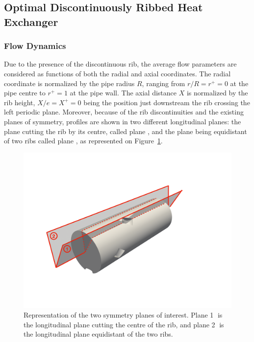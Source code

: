 \subsection{Optimal Discontinuously Ribbed Heat Exchanger}
\label{sec:optimal}
\subsubsection{Flow Dynamics}

Due to the presence of the discontinuous rib, the average flow parameters are considered as functions of both the radial and axial coordinates. The radial coordinate is normalized by the pipe radius $R$, ranging from $r/R=r^+=0$ at the pipe centre to $r^+=1$ at the pipe wall. The axial distance $X$ is normalized by the rib height, $X/e=X^+=0$ being the position just downstream the rib crossing the left periodic plane. Moreover, because of the rib discontinuities and the existing planes of symmetry, profiles are shown in two different longitudinal planes: the plane cutting the rib by its centre, called plane , and the plane being equidistant of two ribs called plane , as represented on Figure~\ref{planes}.\\

\begin{figure}[!h]
\centering
\includegraphics[width=0.6\linewidth,keepaspectratio]{fig/applications/optim/PlaneS.pdf}
\caption{Representation of the two symmetry planes of interest. Plane \textcircled{1} is the longitudinal plane cutting the centre of the rib, and plane \textcircled{2} is the longitudinal plane equidistant of the two ribs.}
\label{planes}
\end{figure}

